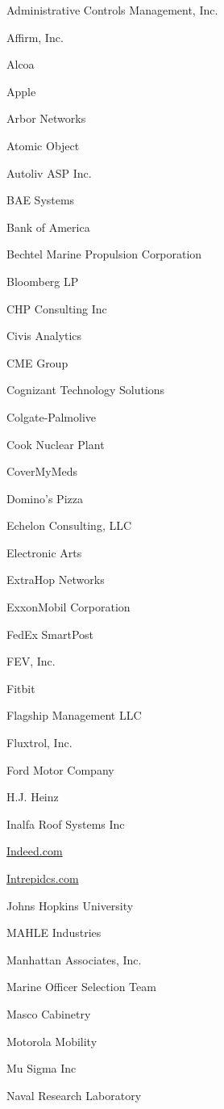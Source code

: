 \documentclass[twoside]{article}
\begin{document}
\begin{center}
\begin{multicols}{5}
\begin{FlushLeft}
\begin{compactitem}
\item Administrative Controls Management, Inc.
\item Affirm, Inc.
\item Alcoa
\item Apple
\item Arbor Networks
\item Atomic Object
\item Autoliv ASP Inc.
\item BAE Systems
\item Bank of America
\item Bechtel Marine Propulsion Corporation
\item Bloomberg LP
\item CHP Consulting Inc
\item Civis Analytics
\item CME Group
\item Cognizant Technology Solutions
\item Colgate-Palmolive
\item Cook Nuclear Plant
\item CoverMyMeds
\item Domino's Pizza
\item Echelon Consulting, LLC
\item Electronic Arts
\item ExtraHop Networks
\item ExxonMobil Corporation
\item FedEx SmartPost
\item FEV, Inc.
\item Fitbit
\item Flagship Management LLC
\item Fluxtrol, Inc.
\item Ford Motor Company
\item H.J. Heinz
\item Inalfa Roof Systems Inc
\item \url{Indeed.com}
\item \url{Intrepidcs.com}
\item Johns Hopkins University
\item MAHLE Industries
\item Manhattan Associates, Inc.
\item Marine Officer Selection Team
\item Masco Cabinetry
\item Motorola Mobility
\item Mu Sigma Inc
\item Naval Research Laboratory

\end{compactitem}
\end{FlushLeft}
\end{multicols}
\end{center}
\end{document}
